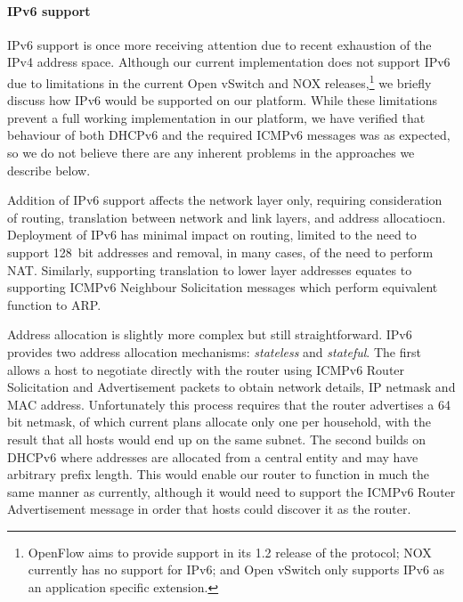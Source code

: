 \paragraph{IPv6 support}
IPv6 support is once more receiving attention due to recent exhaustion
of the IPv4 address space.  Although our current implementation does
not support IPv6 due to limitations in the current Open vSwitch and
NOX releases,\footnote{OpenFlow aims to provide support in its 1.2
release of the protocol; NOX currently has no support for IPv6; and
Open vSwitch only supports IPv6 as an application specific extension.}
we briefly discuss how IPv6 would be supported on our platform.  While
these limitations prevent a full working implementation in our
platform, we have verified that behaviour of both DHCPv6 and the required
ICMPv6 messages was as expected, so we do not believe there are
any inherent problems in the approaches we describe below.

Addition of IPv6 support affects the network layer only, requiring
consideration of routing, translation between network and link layers,
and address allocatiocn.  Deployment of IPv6 has minimal impact on
routing, limited to the need to support 128~bit addresses and removal,
in many cases, of the need to perform NAT.
Similarly, supporting translation to lower layer addresses equates to
supporting ICMPv6 Neighbour Solicitation messages which perform
equivalent function to ARP.


Address allocation is slightly more complex but still straightforward.
IPv6 provides two address allocation mechanisms: \emph{stateless} and
\emph{stateful}.  The first allows a host to negotiate directly with
the router using ICMPv6 Router Solicitation and Advertisement packets
to obtain network details, IP netmask and MAC address.  Unfortunately
this process requires that the router advertises a 64 bit netmask, of
which current plans allocate only one per household, with the result that
all hosts would end up on the same subnet.  The second builds on
DHCPv6 where addresses are allocated from a central entity and may
have arbitrary prefix length.  This would enable our router to
function in much the same manner as currently, although it would
need to support the ICMPv6 Router Advertisement message in order that
hosts could discover it as the router. 


